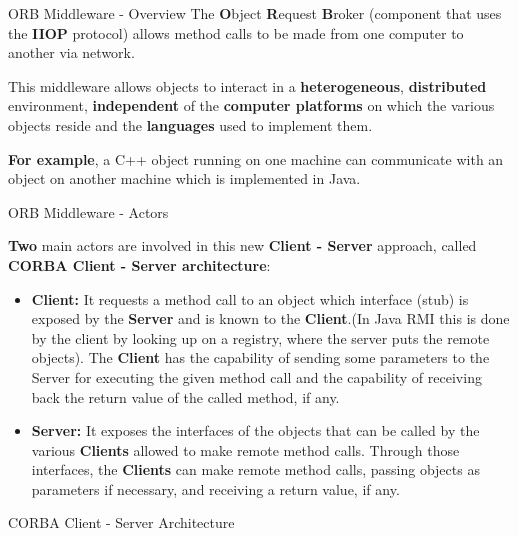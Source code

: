 \documentclass{../common/latex_classes/pdf_presentation}
\begin{document}
		\begin{frame}{ORB Middleware - Overview}
			The \textbf{O}bject \textbf{R}equest \textbf{B}roker
			(component that uses the \textbf{IIOP} protocol) 
			allows method calls to be made from one computer to another via network. \par This middleware allows objects to interact in a \textbf{heterogeneous}, \textbf{distributed} environment, \textbf{independent} of the \textbf{computer platforms} on which the various objects reside and the \textbf{languages} used to implement them. \par \textbf{For example}, a C++ object running on one machine can communicate with an object on another machine which is implemented in Java. 
			
		\end{frame}
			
		\begin{frame}{ORB Middleware - Actors}
			
			\textbf{Two} main actors are involved in this new \textbf{Client - Server} approach, called \textbf{CORBA Client - Server architecture}:
			\begin{itemize}
				\item \textbf{Client:}
				It requests a method call to an object which interface (stub) is exposed by the \textbf{Server} and is known to the \textbf{Client}.(In Java RMI this is done by the client by looking up on a registry, where the server puts the remote objects).
				The \textbf{Client} has the capability of sending some parameters to the Server for executing the given method call and the capability of receiving back the return value of the called method, if any.
				\item \textbf{Server:}
				It exposes the interfaces of the objects that can be called by the various \textbf{Clients} allowed to make remote method calls.
				Through those interfaces, the \textbf{Clients} can make remote method calls, passing objects as parameters if necessary, and receiving a return value, if any.
			\end{itemize}
		\end{frame}
		
		\begin{frame}{CORBA Client - Server Architecture}
		\end{frame}
		
\end{document}
